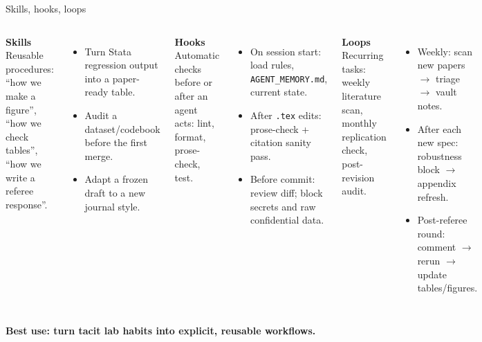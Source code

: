 \begin{frame}{Skills, hooks, loops}
  \begin{columns}[T,onlytextwidth]
      \textbf{Skills}\\[0.1cm]
      {\small Reusable procedures: ``how we make a figure'', ``how we check tables'', ``how we write a referee response''.}
      \vspace{0.12cm}
      {\scriptsize
      \begin{itemize}\setlength\itemsep{0.08em}\setlength\leftmargini{0.85em}
        \item Turn Stata regression output into a paper-ready table.
        \item Audit a dataset/codebook before the first merge.
        \item Adapt a frozen draft to a new journal style.
      \end{itemize}}
      \textbf{Hooks}\\[0.1cm]
      {\small Automatic checks before or after an agent acts: lint, format, prose-check, test.}
      \vspace{0.12cm}
      {\scriptsize
      \begin{itemize}\setlength\itemsep{0.08em}\setlength\leftmargini{0.85em}
        \item On session start: load rules, \texttt{AGENT\_MEMORY.md}, current state.
        \item After \texttt{.tex} edits: prose-check + citation sanity pass.
        \item Before commit: review diff; block secrets and raw confidential data.
      \end{itemize}}
      \textbf{Loops}\\[0.1cm]
      {\small Recurring tasks: weekly literature scan, monthly replication check, post-revision audit.}
      \vspace{0.12cm}
      {\scriptsize
      \begin{itemize}\setlength\itemsep{0.08em}\setlength\leftmargini{0.85em}
        \item Weekly: scan new papers $\rightarrow$ triage $\rightarrow$ vault notes.
        \item After each new spec: robustness block $\rightarrow$ appendix refresh.
        \item Post-referee round: comment $\rightarrow$ rerun $\rightarrow$ update tables/figures.
      \end{itemize}}
  \end{columns}
  \vspace{0.6cm}
  \begin{center}\large\color{deepblue}\bfseries Best use: turn tacit lab habits into explicit, reusable workflows.\end{center}
\end{frame}

